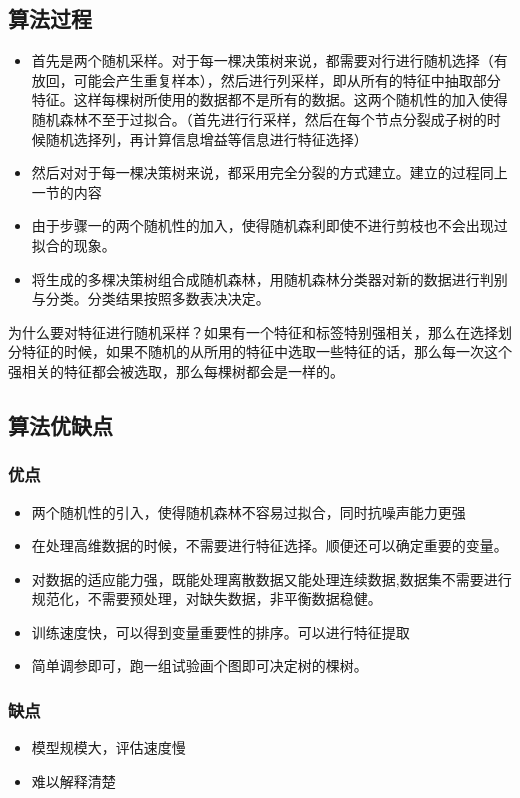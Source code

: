 	\subsection{算法过程}
	\begin{itemize}
		\item 首先是两个随机采样。对于每一棵决策树来说，都需要对行进行随机选择（有放回，可能会产生重复样本），然后进行列采样，即从所有的特征中抽取部分特征。这样每棵树所使用的数据都不是所有的数据。这两个随机性的加入使得随机森林不至于过拟合。（首先进行行采样，然后在每个节点分裂成子树的时候随机选择列，再计算信息增益等信息进行特征选择）
		\item 然后对对于每一棵决策树来说，都采用完全分裂的方式建立。建立的过程同上一节的内容
		\item 由于步骤一的两个随机性的加入，使得随机森利即使不进行剪枝也不会出现过拟合的现象。
		\item 将生成的多棵决策树组合成随机森林，用随机森林分类器对新的数据进行判别与分类。分类结果按照多数表决决定。
	\end{itemize}
	
	为什么要对特征进行随机采样？如果有一个特征和标签特别强相关，那么在选择划分特征的时候，如果不随机的从所用的特征中选取一些特征的话，那么每一次这个强相关的特征都会被选取，那么每棵树都会是一样的。
	
	
	\subsection{算法优缺点}
	\subsubsection{优点}
	\begin{itemize}
		\item 两个随机性的引入，使得随机森林不容易过拟合，同时抗噪声能力更强
		\item 在处理高维数据的时候，不需要进行特征选择。顺便还可以确定重要的变量。
		\item 对数据的适应能力强，既能处理离散数据又能处理连续数据,数据集不需要进行规范化，不需要预处理，对缺失数据，非平衡数据稳健。
		\item 训练速度快，可以得到变量重要性的排序。可以进行特征提取
		\item 简单调参即可，跑一组试验画个图即可决定树的棵树。
	\end{itemize}
	\subsubsection{缺点}
	\begin{itemize}
		\item 模型规模大，评估速度慢
		\item 难以解释清楚
	\end{itemize}
	
